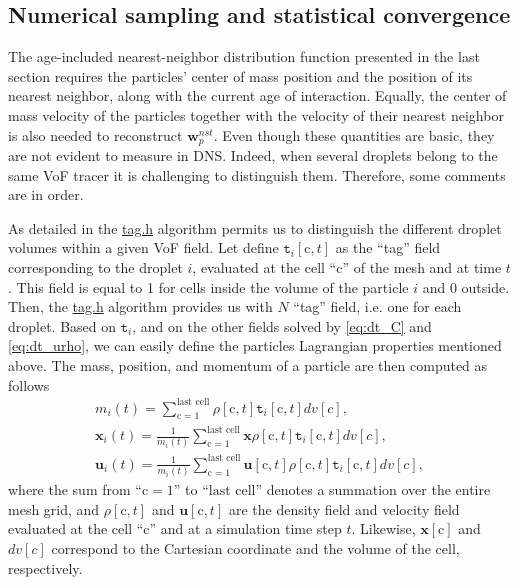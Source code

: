 \subsection{Numerical sampling and statistical convergence}

The age-included nearest-neighbor distribution function presented in the last section requires the particles' center of mass position and the position of its nearest neighbor, along with the current age of interaction.
Equally, the center of mass velocity of the particles together with the velocity of their nearest neighbor is also needed to reconstruct $\textbf{w}_p^{nst}$. 
Even though these quantities are basic, they are not evident to measure in DNS.
Indeed, when several droplets belong to the same VoF tracer it is challenging to distinguish them.
Therefore, some comments are in order.   

As detailed in \citet{fintzi2024buoyancy} the \href{http://basilisk.fr/src/tag.h}{tag.h} algorithm permits us to distinguish the different droplet volumes within a given VoF field. 
Let define $\texttt{t}_i[\text{c},t]$ as the ``tag'' field corresponding to the droplet $i$, evaluated at the cell ``c'' of the mesh and at time $t$.
This field is equal to 1 for cells inside the volume of the particle $i$ and 0 outside.
Then, the \href{http://basilisk.fr/src/tag.h}{tag.h} algorithm provides us with $N$ ``tag'' field, i.e. one for each droplet. 
Based on $\texttt{t}_i$, and on the other fields solved by \ref{eq:dt_C} and \ref{eq:dt_urho}, we can easily define the particles Lagrangian properties mentioned above. 
The mass, position, and momentum of a particle are then computed as follows 
\begin{align*}
    m_i(t)
    = \sum_{\text{c} = 1}^\text{last cell}
    \rho [\text{c},t]
    \texttt{t}_i[\text{c},t]dv[c],
    \\ 
    \textbf{x}_i(t)
    = 
    \frac{1}{m_i(t)}
    \sum_{\text{c} = 1}^\text{last cell}
    \textbf{x} 
    \rho [\text{c},t]
    \texttt{t}_i[\text{c},t]dv[c],
    \\ 
    \textbf{u}_i(t)
    = 
    \frac{1}{m_i(t)}
    \sum_{\text{c} = 1}^\text{last cell}
    \textbf{u} [\text{c},t]
    \rho [\text{c},t]
    \texttt{t}_i[\text{c},t]dv[c],
\end{align*}
where the sum from ``$\text{c} = 1$'' to ``$\text{last cell}$'' denotes a summation over the entire mesh grid, and $\rho[\text{c},t]$ and $\textbf{u}[\text{c},t]$ are the density field and velocity field evaluated at the cell ``c'' and at a simulation time step $t$. 
Likewise, $\textbf{x}[\text{c}]$ and $dv[c]$ correspond to the Cartesian coordinate and the volume of the cell, respectively. 

